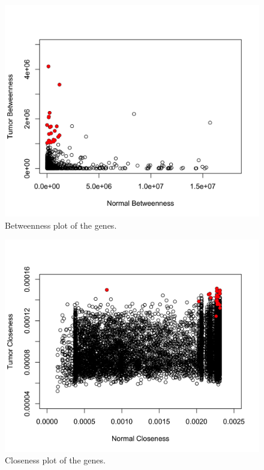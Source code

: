 \documentclass{article}\usepackage[]{graphicx}\usepackage[]{color}
\begin{document}
\begin{figure}
\includegraphics[scale=.1]{Fig3.jpeg}
\caption{Betweenness plot of the genes.}
\end{figure}

\begin{figure}
\includegraphics[scale=.1]{Fig4.jpeg}
\caption{Closeness plot of the genes.}
\end{figure}
\end{document}
